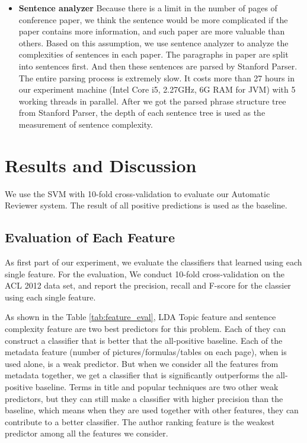 \documentclass[11pt,letterpaper]{article}
\begin{document}
\begin{itemize}
\item	{\bf Sentence analyzer}
Because there is a limit in the number of pages of conference paper, we think the sentence would be more complicated if the paper contains more information, and such paper are more valuable than others. Based on this assumption, we use sentence analyzer to analyze the complexities of sentences in each paper. The paragraphs in paper are split into sentences first. And then these sentences are parsed by Stanford Parser. The entire parsing process is extremely slow. It costs more than 27 hours in our experiment machine (Intel Core i5, 2.27GHz, 6G RAM for JVM) with 5 working threads in parallel. After we got the parsed phrase structure tree from Stanford Parser, the depth of each sentence tree is used as the measurement of sentence complexity. 

\end{itemize} 









\section{Results and Discussion}
We use the SVM with 10-fold cross-validation to evaluate our Automatic Reviewer system. The result of all positive predictions is used as the baseline. 


\subsection{Evaluation of Each Feature}
\label{sec:feature_eval}
As first part of our experiment, 
we evaluate the classifiers that learned using each single feature.
For the evaluation,
We conduct 10-fold cross-validation on the ACL 2012 data set,
and report the precision, recall and F-score for the classier using each single feature.

As shown in the Table \ref{tab:feature_eval},
LDA Topic feature and sentence complexity feature are two best predictors for this problem.
Each of they can construct a classifier that is better that the all-positive baseline.
Each of the metadata feature (number of pictures/formulas/tables on each page),
when is used alone, is a weak predictor.
But when we consider all the features from metadata together,
we get a classifier that is significantly outperforms the all-positive baseline.
Terms in title and popular techniques are two other weak predictors,
but they can still make a classifier with higher precision than the baseline,
which means when they are used together with other features, they can contribute to a better classifier.
The author ranking feature is the weakest predictor among all the features we consider.
\end{document}
